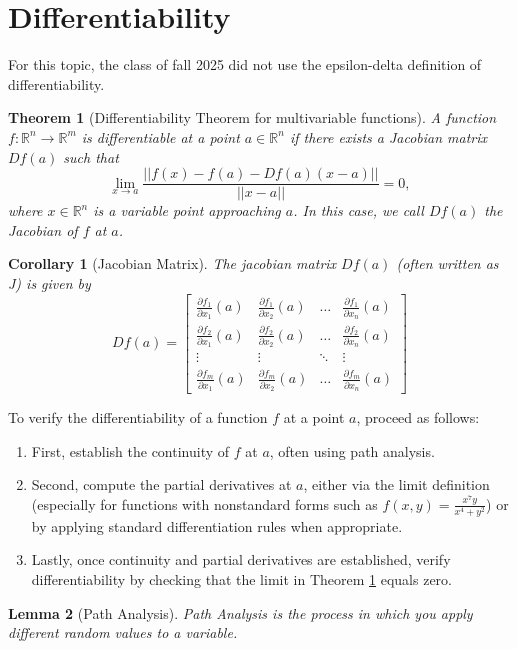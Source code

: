 \documentclass{article}
\newtheorem{theorem}{Theorem}
\newtheorem{corollary}{Corollary}[theorem]
\newtheorem{lemma}[theorem]{Lemma}
\begin{document}
\section{Differentiability}
For this topic, the class of fall 2025 did not use the epsilon-delta definition of differentiability.
\begin{theorem}[Differentiability Theorem for multivariable functions]
    \label{differentiation}
    A function \(f : \mathbb{R}^n \to \mathbb{R}^m\) is differentiable at a point \(a \in \mathbb{R}^n\) if there exists a Jacobian matrix \(Df(a)\) such that
    \[\lim_{x \to a} \frac{||f(x) - f(a) - Df(a)(x - a)||}{||x - a||} = 0,\]
    where \(x \in \mathbb{R}^n\) is a variable point approaching \(a\).
    In this case, we call \(Df(a)\) the Jacobian of \(f\) at \(a\).
\end{theorem}
\begin{corollary}[Jacobian Matrix]
    The jacobian matrix \(Df(a)\) (often written as J) is given by
    \[Df(a) = \begin{bmatrix}
    \frac{\partial f_1}{\partial x_1}(a) & \frac{\partial f_1}{\partial x_2}(a) & \ldots & \frac{\partial f_1}{\partial x_n}(a) \\
    \frac{\partial f_2}{\partial x_1}(a) & \frac{\partial f_2}{\partial x_2}(a) & \ldots & \frac{\partial f_2}{\partial x_n}(a) \\
    \vdots & \vdots & \ddots & \vdots \\
    \frac{\partial f_m}{\partial x_1}(a) & \frac{\partial f_m}{\partial x_2}(a) & \ldots & \frac{\partial f_m}{\partial x_n}(a)
    \end{bmatrix}\]
\end{corollary}
\noindent To verify the differentiability of a function \(f\) at a point \(a\), proceed as follows:
\begin{enumerate}
    \item First, establish the continuity of \(f\) at \(a\), often using path analysis.
    \item Second, compute the partial derivatives at \(a\), either via the limit definition (especially for functions with nonstandard forms such as \( f(x,y) = \frac{x^7y}{x^4+y^2} \)) or by applying standard differentiation rules when appropriate. 
    \item Lastly, once continuity and partial derivatives are established, verify differentiability by checking that the limit in Theorem \ref{differentiation} equals zero.
\end{enumerate}
\begin{lemma}[Path Analysis]
    Path Analysis is the process in which you apply different random values to a variable.
\end{lemma}
\end{document}
